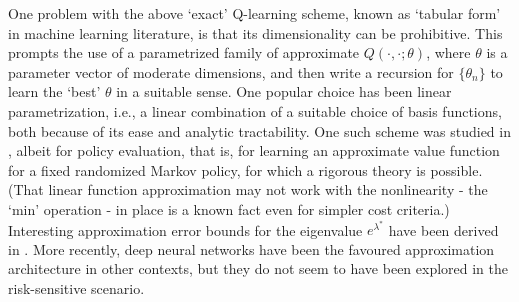\documentclass[notitlepage,11pt,reqno]{amsart}
\numberwithin{equation}{section}
\theoremstyle{plain}
\theoremstyle{definition}
\theoremstyle{remark}
\begin{document}
One problem with the above `exact' Q-learning scheme, known as `tabular form' in machine learning literature, is that its dimensionality can be prohibitive. This prompts the use of a parametrized family of approximate $Q(\cdot,\cdot; \theta)$, where $\theta$ is a parameter vector of moderate dimensions, and then write a recursion for $\{\theta_n\}$ to learn the `best' $\theta$ in a suitable sense. One popular choice has been linear parametrization, i.e.,  a linear combination of a suitable choice of basis functions, both because of its ease and analytic tractability. One such scheme was studied in \cite{MR2464648}, albeit for policy evaluation, that is, for learning an approximate value function for a fixed randomized Markov policy, for which a rigorous theory is possible. (That linear function approximation may not work with the nonlinearity - the `min' operation - in place is a known fact even for simpler cost criteria.)  Interesting approximation error bounds for the eigenvalue $e^{\lambda^*}$ have been derived in \cite{Karm}. More recently, deep neural networks have been the favoured approximation architecture in other contexts, but they do not seem to have been explored in the risk-sensitive scenario.
\end{document}
